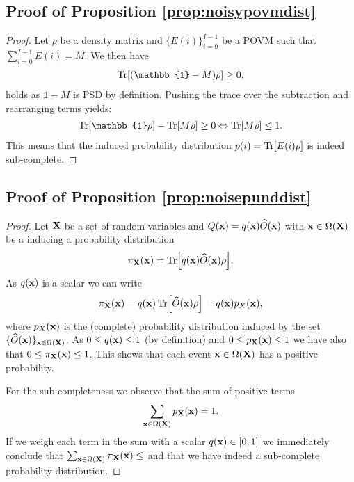 \subsection{Proof of Proposition \ref{prop:noisypovmdist}}
\label{sec:proof:prop:noisypovmdist}

\propnoisypovmdist*

\begin{proof}
	Let $\rho$ be a density matrix and $\{E(i)\}_{i=0}^{I-1} $ be a POVM such that $\sum_{i=0}^{I-1} E(i)=M$. We then have
	\begin{align}
		\Tr[(\mathbb{1}-M) \rho]\geq 0,
	\end{align}
	holds as $\mathbb{1}-M$ is PSD by definition.
	Pushing the trace over the subtraction and rearranging terms yields:
	\begin{align}
		\Tr[\mathbb{1} \rho]- 	\Tr[M \rho]\geq 0 \Leftrightarrow \Tr[M \rho]\leq 1.
	\end{align}
	This means that the induced probability distribution $p(i)= \Tr[E(i)\rho]$ is indeed sub-complete.
\end{proof}





\subsection{Proof of Proposition \ref{prop:noisepunddist}}
\label{sec:proof:prop:noisepunddist}

\propnoisepunddist*

\begin{proof}
	Let $\mathbf{X}$ be a set of random variables and  $Q(\mathbf{x})= q(\mathbf{x})\widehat{O}(\mathbf{x})$ with $\mathbf{x}\in \Omega(\mathbf{X})$ be a \noisepunc inducing a probability distribution
	\begin{align}
		\pi_{\mathbf{X}}(\mathbf{x}) = \Tr [ q(\mathbf{x})\widehat{O}(\mathbf{x}) \rho].
	\end{align}
	As $q(\mathbf{x})$ is a scalar we can write
	\begin{align}
		\pi_{\mathbf{X}}(\mathbf{x}) = q(\mathbf{x}) \Tr [ \widehat{O}(\mathbf{x}) \rho] = q(\mathbf{x}) p_X(\mathbf{x}),
	\end{align}
	where $p_X(\mathbf{x})$ is the (complete) probability distribution induced by the set $\{ \widehat{O}(\mathbf{x}) \}_{\mathbf{x} \in \Omega(\mathbf{X})}$. As $0\leq q(\mathbf{x})\leq 1$ (by definition) and $0\leq p_{\mathbf{X}}(\mathbf{x})\leq 1$ we have also that $0\leq \pi_{\mathbf{X}}(\mathbf{x})\leq 1$. This shows that each event $\mathbf{x}\in \Omega(\mathbf{X})$ has a positive probability.

	For the sub-completeness we observe that the sum of positive terms
	\begin{align}
		\sum_{\mathbf{x} \in \Omega(\mathbf{X})} p_{\mathbf{X}}(\mathbf{x})=1.
	\end{align}
	If we weigh each term in the sum with a scalar $q(\mathbf{x}) \in [0,1]$ we immediately conclude that $\sum_{\mathbf{x} \in \Omega(\mathbf{X})} \pi_{\mathbf{X}} (\mathbf{x})\leq$ and that we have indeed a sub-complete probability distribution.
\end{proof}




